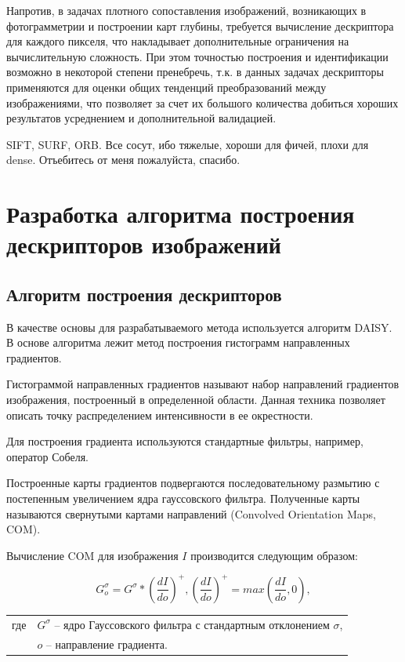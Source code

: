 {{{	Напротив, в задачах плотного сопоставления изображений, возникающих в фотограмметрии и построении карт глубины, требуется вычисление дескриптора для каждого пикселя, что накладывает дополнительные ограничения на вычислительную сложность. При этом точностью построения и идентификации возможно в некоторой степени пренебречь, т.к. в данных задачах дескрипторы применяются для оценки общих тенденций преобразований между изображениями, что позволяет за счет их большого количества добиться хороших результатов усреднением и дополнительной валидацией.
	
	SIFT, SURF, ORB. Все сосут, ибо тяжелые, хороши для фичей, плохи для dense. Отъебитесь от меня пожалуйста, спасибо.
}

\newpage

\section{Разработка алгоритма построения дескрипторов изображений}
{
	\subsection{Алгоритм построения дескрипторов}
	{
		В качестве основы для разрабатываемого метода используется алгоритм DAISY.
		В основе алгоритма лежит метод построения гистограмм направленных градиентов. 
		
		Гистограммой направленных градиентов называют набор направлений градиентов изображения, построенный в определенной области. Данная техника позволяет описать точку распределением интенсивности в ее окрестности.    
		
		Для построения градиента используются стандартные фильтры, например, оператор Собеля. 
		
		Построенные карты градиентов подвергаются последовательному размытию с постепенным увеличением ядра гауссовского фильтра. Полученные карты называются свернутыми картами направлений (Convolved Orientation Maps, COM).
		
		Вычисление COM для изображения $I$ производится следующим образом:
		
		\begin{equation}\label{coms}
		G_o^\sigma = G^\sigma * \left(\dfrac{dI}{do}\right)^+ , \left(\dfrac{dI}{do}\right)^+ = max\left(\dfrac{dI}{do}, 0\right),
		\end{equation}
		\begin{tabular}{ rl }
			\quad \quad где 
			& $ G^\sigma $ -- ядро Гауссовского фильтра с стандартным отклонением $ \sigma $,\\
			& $o$ -- направление градиента.
		\end{tabular}\\
		
}}}}
